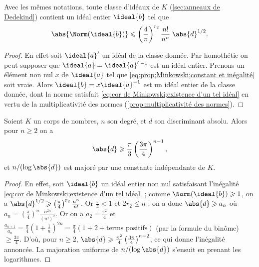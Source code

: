 \documentclass[11pt, useosf,
  title in boldface,
  theorem in new line,
  theorem numbering = section,
  number theorems separately,
]{simplivre}
\begin{document}
\vspace{-.5\baselineskip}
    \begin{corollary}\label{cor:Minkowski;existence d'un tel idéal}
        Avec les mêmes notations, toute classe d'idéaux de \( K \) (\cref{sec:anneaux de Dedekind}) contient un idéal entier \( \ideal{b} \) tel que
        \begin{equation}\label{eq:cor de Minkowski;existence d'un tel idéal}
            \abs{\Norm(\ideal{b})} \leqslant \left(\frac{4}{\pi}\right)^{r_2} \frac{n!}{n^n} \; \abs{d}^{1/2}.
        \end{equation}
    \end{corollary}
    \begin{proof}
        En effet soit \( \ideal{a}' \) un idéal de la classe donnée. Par homothétie on peut supposer que \( \ideal{a} = \ideal{a}'\,{}^{-1} \) est un idéal entier. Prenons un élément non nul \( x \) de \( \ideal{a} \) tel que \eqref{eq:prop;Minkowski;constant et inégalité} soit vraie. Alors \( \ideal{b} = x \ideal{a}^{-1} \) est un idéal entier de la classe donnée, dont la norme satisfait \eqref{eq:cor de Minkowski;existence d'un tel idéal} en vertu de la multiplicativité des normes (\cref{prop:multiplicativité des normes}).
    \end{proof}

    \begin{corollary}\label{cor:Minkowski;discriminant absolu}
        Soient \( K \) un corps de nombres, \( n \) son degré, et \( d \) son discriminant absolu. Alors pour \( n \geqslant 2 \) on a
        \[
            \abs{d} \geqslant \frac{\pi}{3} \left(\frac{3\pi}{4}\right)^{n-1},
        \]
        et \( n/(\log \abs{d}) \) est majoré par une constante indépendante de \( K \).
    \end{corollary}
    \begin{proof}
        En effet, soit \( \ideal{b} \) un idéal entier non nul satisfaisant l'inégalité \eqref{eq:cor de Minkowski;existence d'un tel idéal} ; comme \( \Norm(\ideal{b}) \geqslant 1 \), on a \( \abs{d}^{1/2} \geqslant \left(\frac{\pi}{4}\right)^{r_2} \frac{n^n}{n!} \). Or \( \frac{\pi}{4} < 1 \) et \( 2r_2 \leqslant n \) ; on a donc \( \abs{d} \geqslant a_n \) où \( a_n = \left(\frac{\pi}{4}\right)^n \frac{n^{2n}}{(n!)^2} \). Or on a \( a_2 = \frac{\pi^2}{4} \) et \( \frac{a_{n+1}}{a_n} = \frac{\pi}{4} \left(1+\frac{1}{n}\right)^{2n} = \frac{\pi}{4} (1+2+\text{terms positifs}) \) (par la formule du binôme) \( \geqslant \frac{3\pi}{4} \). D'où, pour \( n \geqslant 2 \), \( \abs{d} \geqslant \frac{\pi^2}{4} \left(\frac{3\pi}{4}\right)^{n-2} \), ce qui donne l'inégalité annoncée. La majoration uniforme de \( n/(\log \abs{d}) \) s'ensuit en prenant les logarithmes.
    \end{proof}
\end{document}
